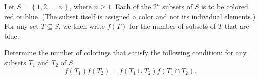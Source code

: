 Let $S = \left\{ 1,2,\dots,n \right\}$,  where $n \ge 1$. Each of the $2^n$ subsets of $S$ is to be colored red or blue. (The subset itself is assigned a color and not its individual elements.) For any set $T \subseteq S$,  we then write $f(T)$ for the number of subsets of $T$ that are blue.

Determine the number of colorings that satisfy the following condition: for any subsets $T_1$ and $T_2$ of $S$,  \[ f(T_1)f(T_2) = f(T_1 \cup T_2)f(T_1 \cap T_2). \]